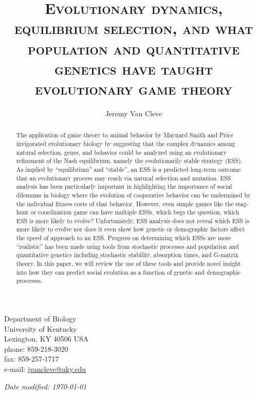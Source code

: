 \documentclass[11pt]{article}
\begin{document}
\begin{titlingpage}
\setlength{\droptitle}{2em}
\pretitle{\begin{center}\LARGE}
\posttitle{\par\end{center}\vskip 2.5em}

\title{\scshape Evolutionary dynamics, equilibrium selection, and what population and quantitative genetics have taught evolutionary game theory}
\author{Jeremy Van Cleve}
\date{}
\maketitle

\vfill

\noindent
Department of Biology\\
University of Kentucky\\
Lexington, KY 40506 USA\\[1em]
phone: 859-218-3020\\
fax: 859-257-1717\\[1em]
e-mail: \href{mailto:jvancleve@uky.edu}{jvancleve@uky.edu}

\vspace{2em}

\begin{flushright} \textit{Date modified: \today} \end{flushright}
\end{titlingpage}

\linenumbers
\onehalfspacing
\begin{abstract}

The application of game theory to animal behavior by Maynard Smith and Price invigorated evolutionary biology by suggesting that the complex dynamics among natural selection, genes, and behavior could be analyzed using an evolutionary refinement of the Nash equilibrium, namely the evolutionarily stable strategy (ESS)\@. As implied by ``equilibrium'' and ``stable'', an ESS is a predicted long-term outcome that an evolutionary process may reach via natural selection and mutation. ESS analysis has been particularly important in highlighting the importance of social dilemmas in biology where the evolution of cooperative behavior can be undermined by the individual fitness costs of that behavior. However, even simple games like the stag-hunt or coordination game can have multiple ESSs, which begs the question, which ESS is more likely to evolve? Unfortunately, ESS analysis does not reveal which ESS is more likely to evolve nor does it even show how genetic or demographic factors affect the speed of approach to an ESS. Progress on determining which ESSs are more ``realistic'' has been made using tools from stochastic processes and population and quantitative genetics including stochastic stability, absorption times, and G-matrix theory. In this paper, we will review the use of these tools and provide novel insight into how they can predict social evolution as a function of genetic and demographic processes.

\end{abstract}
\end{document}
